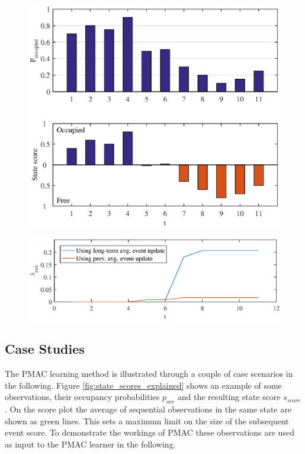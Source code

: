 \begin{figure}[htbp]
    \centering
    \includegraphics[scale=1]{chapters/mapping_of_dynamic_areas/figures/pmac_noise_problem_case}
    \caption{}
    \label{fig:pmac_noise_problem_case}
\end{figure}


\begin{figure}[htbp]
    \centering
    \includegraphics[scale=1]{chapters/mapping_of_dynamic_areas/figures/visualization_of_advantage_long_term_average}
    \caption{}
    \label{fig:visualization_of_advantage_long_term_average}
\end{figure}

\subsection{Case Studies}
The PMAC learning method is illustrated through a couple of case scenarios in the following. 
Figure \ref{fig:state_scores_explained} shows an example of some observations, their occupancy probabilities $p_{occ}$ and the resulting state score $s_{score}$. On the score plot the average of sequential observations in the same state are shown as green lines. This sets a maximum limit on the size of the subsequent event score. To demonstrate the workings of PMAC these observations are used as input to the PMAC learner in the following. 

